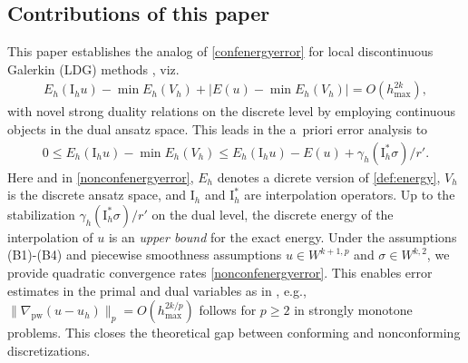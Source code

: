 \documentclass[a4paper]{amsart}
\numberwithin{equation}{section}
\newcommand{\pw}{\mathrm{pw}}
\theoremstyle{remark}
\begin{document}
\subsection{Contributions of this paper}
This paper establishes the analog of \eqref{confenergyerror} for 
local discontinuous Galerkin (LDG) methods %
\cite{CockburnShu1998,BurmanErn2008,DiPietroErn2012}, viz.
\begin{align}\label{nonconfenergyerror}
E_h(\mathrm{I}_h u) - \min E_h(V_h) + |E(u) - \min E_h(V_h)|
=O(h_{\max}^{2k}),
\end{align}
with novel strong duality relations on the discrete level by employing continuous objects in the dual ansatz space.
This leads in the a~priori error analysis to %
\begin{align*}
	0 \leq E_h(\mathrm{I}_h u) - \min E_h(V_h) \leq E_h(\mathrm{I}_h u) - E(u) + \gamma_h(\mathrm{I}_h^* \sigma)/r'.
\end{align*}
Here and in \eqref{nonconfenergyerror}, 
$E_h$ denotes a dicrete version of \eqref{def:energy}, 
$V_h$ is the discrete ansatz space, 
and $\mathrm{I}_h$ and $\mathrm{I}_h^*$ are interpolation operators. 
Up to the stabilization $\gamma_h(\mathrm{I}_h^* \sigma)/r'$ on the dual level, the discrete energy of the interpolation of $u$ is an {\em upper bound} for the exact energy. Under the assumptions (B1)-(B4) and
piecewise 
smoothness assumptions $u \in W^{k+1,p}$ and $\sigma \in W^{k,2}$, we provide quadratic convergence rates \eqref{nonconfenergyerror}.
This enables 
error estimates in the primal and dual variables as in \cite[Section 4]{Tran2024}, e.g.,
$\|\nabla_\pw(u-u_h)\|_{p} = O(h_{\max}^{2k/p})$ follows
for $p \geq 2$ in strongly monotone problems. 
%
This closes the theoretical gap between conforming and nonconforming discretizations.
\end{document}

